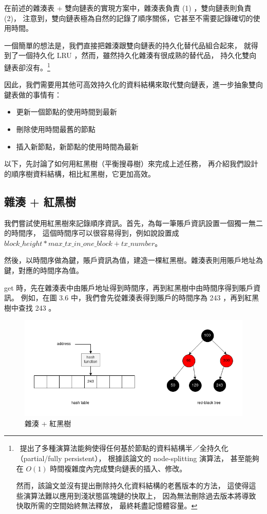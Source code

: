 在前述的雜湊表 + 雙向鏈表的實現方案中，雜湊表負責 (1) ，雙向鏈表則負責 (2)，
注意到，雙向鏈表極為自然的記錄了順序關係，它甚至不需要記錄確切的使用時間。

一個簡單的想法是，我們直接把雜湊跟雙向鏈表的持久化替代品組合起來，
就得到了一個持久化 LRU ，然而，雖然持久化雜湊有很成熟的替代品，
持久化雙向鏈表卻沒有。\footnote{
~\cite{driscoll1986making}提出了多種演算法能夠使得任何基於節點的資料結構半／全持久化（partial/fully persistent），
根據該論文的 node-splitting 演算法，
甚至能夠在 $O(1)$ 時間複雜度內完成雙向鏈表的插入、修改。

然而，該論文並沒有提出刪除持久化資料結構的老舊版本的方法，
這使得這些演算法難以應用到淺狀態區塊鏈的快取上，
因為無法刪除過去版本將導致快取所需的空間始終無法釋放，
最終耗盡記憶體容量。
}

因此，我們需要用其他可高效持久化的資料結構來取代雙向鏈表，進一步抽象雙向鍵表做的事情有：

\begin{itemize}
  \item 更新一個節點的使用時間到最新
  \item 刪除使用時間最舊的節點
  \item 插入新節點，新節點的使用時間為最新
\end{itemize}

以下，先討論了如何用紅黑樹\cite{guibas1978dichromatic}（平衡搜尋樹）來完成上述任務，
再介紹我們設計的順序樹資料結構，相比紅黑樹，它更加高效。

\subsection{雜湊 + 紅黑樹}

我們嘗試使用紅黑樹來記錄順序資訊。首先，為每一筆賬戶資訊設置一個獨一無二的時間序，
這個時間序可以很容易得到，例如說設置成 $block\_height * max\_tx\_in\_one\_block + tx\_number$。

然後，以時間序做為鍵，賬戶資訊為值，建造一棵紅黑樹。雜湊表則用賬戶地址為鍵，對應的時間序為值。

get 時，先在雜湊表中由賬戶地址得到時間序，再到紅黑樹中由時間序得到賬戶資訊。
例如，在圖 3.6 中，我們會先從雜湊表得到賬戶的時間序為 243 ，再到紅黑樹中查找 243 。

\begin{figure}[h!]
\includegraphics[width=\textwidth]{雜湊紅黑樹}
\caption{雜湊 + 紅黑樹}
\end{figure}

